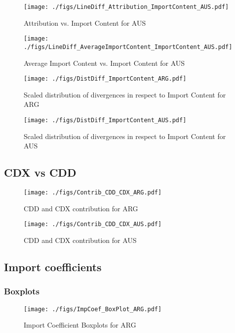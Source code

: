 \documentclass[11pt]{article}
\begin{document}
\begin{figure}[H]
\centering
\texttt{[image: ./figs/LineDiff\_Attribution\_ImportContent\_AUS.pdf]}
\caption{Attribution vs. Import Content for AUS}
\end{figure}

\begin{figure}[H]
\centering
\texttt{[image: ./figs/LineDiff\_AverageImportContent\_ImportContent\_AUS.pdf]}
\caption{Average Import Content vs. Import Content for AUS}
\end{figure}
\begin{figure}[H]
\centering
\texttt{[image: ./figs/DistDiff\_ImportContent\_ARG.pdf]}
\caption{Scaled distribution of divergences in respect to Import Content for ARG}
\end{figure}

\begin{figure}[H]
\centering
\texttt{[image: ./figs/DistDiff\_ImportContent\_AUS.pdf]}
\caption{Scaled distribution of divergences in respect to Import Content for AUS}
\end{figure}
\subsection{CDX vs CDD}
\label{sec:org22a30ac}


\begin{figure}[t]
\centering
\texttt{[image: ./figs/Contrib\_CDD\_CDX\_ARG.pdf]}
\caption{CDD and CDX contribution for ARG}
\end{figure}

\begin{figure}[t]
\centering
\texttt{[image: ./figs/Contrib\_CDD\_CDX\_AUS.pdf]}
\caption{CDD and CDX contribution for AUS}
\end{figure}
\subsection{Import coefficients}
\label{sec:orgd5ad282}

\subsubsection{Boxplots}
\label{sec:org494e0bd}


\begin{figure}[t]
\centering
\texttt{[image: ./figs/ImpCoef\_BoxPlot\_ARG.pdf]}
\caption{Import Coefficient Boxplots for ARG}
\end{figure}
\end{document}

